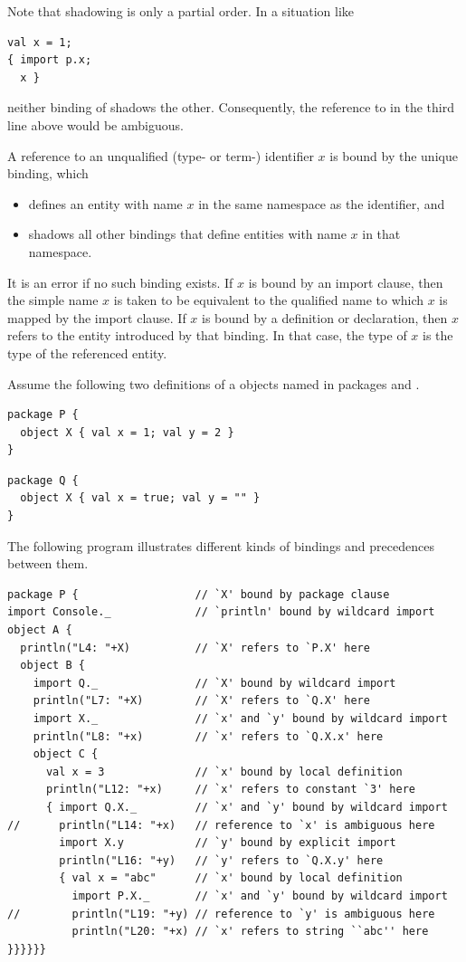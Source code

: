 Note that shadowing is only a partial order. In a situation like
\begin{lstlisting}
val x = 1;
{ import p.x; 
  x }
\end{lstlisting}
neither binding of  shadows the other. Consequently, the
reference to  in the third line above would be ambiguous.

A reference to an unqualified (type- or term-) identifier $x$ is bound
by the unique binding, which
\begin{itemize}
\item defines an entity with name $x$ in the same namespace as the
identifier, and
\item shadows all other bindings that define entities with name $x$ in that namespace.
\end{itemize}
It is an error if no such binding exists.  If $x$ is bound by an
import clause, then the simple name $x$ is taken to be equivalent to
the qualified name to which $x$ is mapped by the import clause. If $x$
is bound by a definition or declaration, then $x$ refers to the entity
introduced by that binding. In that case, the type of $x$ is the type
of the referenced entity.

\example Assume the following two definitions of a objects named \lstinline@X@ in packages \lstinline@P@ and \lstinline@Q@.
\begin{lstlisting}
package P {
  object X { val x = 1; val y = 2 }
}
\end{lstlisting}
\begin{lstlisting}
package Q {
  object X { val x = true; val y = "" }
}
\end{lstlisting}
The following program illustrates different kinds of bindings and
precedences between them.
\begin{lstlisting}
package P {                  // `X' bound by package clause
import Console._             // `println' bound by wildcard import
object A {                   
  println("L4: "+X)          // `X' refers to `P.X' here
  object B {
    import Q._               // `X' bound by wildcard import
    println("L7: "+X)        // `X' refers to `Q.X' here
    import X._               // `x' and `y' bound by wildcard import
    println("L8: "+x)        // `x' refers to `Q.X.x' here
    object C {
      val x = 3              // `x' bound by local definition
      println("L12: "+x)     // `x' refers to constant `3' here
      { import Q.X._         // `x' and `y' bound by wildcard import
//      println("L14: "+x)   // reference to `x' is ambiguous here
        import X.y           // `y' bound by explicit import
        println("L16: "+y)   // `y' refers to `Q.X.y' here
        { val x = "abc"      // `x' bound by local definition
          import P.X._       // `x' and `y' bound by wildcard import
//        println("L19: "+y) // reference to `y' is ambiguous here
          println("L20: "+x) // `x' refers to string ``abc'' here
}}}}}}
\end{lstlisting}

